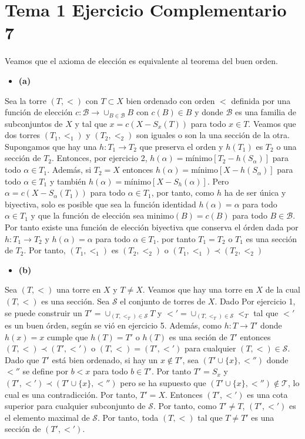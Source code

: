 \documentclass{article}
\begin{document}
\section{Tema 1 Ejercicio Complementario 7}
Veamos que el axioma de elección es equivalente al teorema del buen orden.
\begin{itemize}
\item \bf (a) \rm
\end{itemize}
Sea la torre $(T,<)$ con $T\subset X$ bien ordenado con orden $<$ definida por una función de elección $c:\mathcal{B}\rightarrow \cup_{B\in\mathcal{B}}B$ con $c(B)\in B$ y donde $\mathcal{B}$ es una familia de subconjuntos de $X$ y tal que $x=c(X-S_x(T))$ para todo $x\in T$.
Veamos que dos torres $(T_1,<_1)$ y $(T_2,<_2)$ son iguales o son la una sección de la otra. Supongamos que hay una $h:T_1\rightarrow T_2$ que preserva el orden y $h(T_1)$ es $T_2$ o una sección de $T_2$. Entonces, por ejercicio 2, $h(\alpha)=\text{mínimo}[T_2-h(S_\alpha)]$ para todo $\alpha\in T_1$. Además, si $T_2=X$ entonces $h(\alpha)=\text{mínimo}[X-h(S_\alpha)]$ para todo $\alpha\in T_1$ y también $h(\alpha)=\text{mínimo}[X-S_h(\alpha)]$. Pero $\alpha=c(X-S_\alpha(T_1))$ para todo $\alpha\in T_1$, por tanto, como $h$ ha de ser única y biyectiva, solo es posible que sea la función identidad $h(\alpha)=\alpha$ para todo $\alpha\in T_1$ y que la función de elección sea $ \text{minimo}(B)=c(B)$ para todo $B\in \mathcal{B}$. Por tanto existe una función de elección biyectiva que conserva el órden dada por $h:T_1\rightarrow T_2$ y $h(\alpha)=\alpha$ para todo $\alpha\in T_1$. por tanto $T_1=T_2$ o $T_1$ es una sección de $T_2$. Por tanto, $(T_1,<_1)$ es $(T_2,<_2)$ o $(T_1,<_1)\prec (T_2,<_2)$
\begin{itemize}
\item \bf (b) \rm
\end{itemize}
Sea $(T,<)$ una torre en $X$ y $T\neq X$. Veamos que hay una torre en $X$ de la cual $(T,<)$ es una sección. Sea $\mathcal{S}$ el conjunto de torres de $X$. Dado Por ejercicio 1, se puede construir un $T'=\cup_{(T,<_T)\in \mathcal{S}}T$ y $<'=\cup_{(T,<_T)\in \mathcal{S}}<_T$ tal que $<'$ es un buen órden, según se vió en ejercicio 5. Además, como $h:T\rightarrow T'$ donde $h(x)=x$ cumple que $h(T)=T'$ o $h(T)$ es una seción de $T'$ entonces $(T,<)\prec (T',<')$ o $(T,<)=(T',<')$ para cualquier $(T,<)\in \mathcal{S}$. Dado que $T'$ está bien ordenado, si hay un $x\notin T'$, sea $(T'\cup \{x\},<'')$ donde $<''$ se define por $b<x$ para todo $b\in T'$. Por tanto $T'= S_x$ y $(T',<')\prec (T'\cup \{x\},<'')$ pero se ha supuesto que $(T'\cup \{x\}, <'')\notin \mathcal{T}$, lo cual es una contradicción. Por tanto, $T'=X$. Entonces $(T',<')$ es una cota superior para cualquier subconjunto de $\mathcal{S}$. Por tanto, como $T'\neq T$, $(T',<')$ es el elemento maximal de $\mathcal{S}$. Por tanto, toda $(T,<)$ tal que $T\neq T'$ es una sección de $(T',<')$. 
\end{document}
